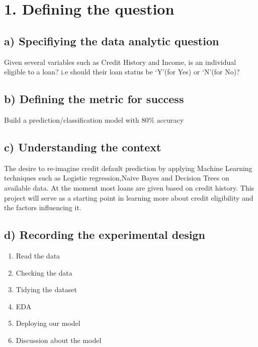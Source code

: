 \documentclass[
]{article}
\author{}
\date{\vspace{-2.5em}}
\providecommand{\tightlist}{%
  \setlength{\itemsep}{0pt}\setlength{\parskip}{0pt}}
\begin{document}
\hypertarget{defining-the-question}{%
\section{1. Defining the question}\label{defining-the-question}}

\hypertarget{a-specifiying-the-data-analytic-question}{%
\subsection{a) Specifiying the data analytic
question}\label{a-specifiying-the-data-analytic-question}}

Given several variables such as Credit History and Income, is an
individual eligible to a loan? i.e should their loan status be `Y'(for
Yes) or `N'(for No)?

\hypertarget{b-defining-the-metric-for-success}{%
\subsection{b) Defining the metric for
success}\label{b-defining-the-metric-for-success}}

Build a prediction/classification model with 80\% accuracy

\hypertarget{c-understanding-the-context}{%
\subsection{c) Understanding the
context}\label{c-understanding-the-context}}

The desire to re-imagine credit default prediction by applying Machine
Learning techniques such as Logistic regression,Naive Bayes and Decision
Trees on available data. At the moment most loans are given based on
credit history. This project will serve as a starting point in learning
more about credit eligibility and the factors influencing it.

\hypertarget{d-recording-the-experimental-design}{%
\subsection{d) Recording the experimental
design}\label{d-recording-the-experimental-design}}

\begin{enumerate}
\def\labelenumi{\Roman{enumi})}
\tightlist
\item
  Read the data
\item
  Checking the data
\item
  Tidying the dataset
\item
  EDA
\item
  Deploying our model
\item
  Discussion about the model
\end{enumerate}
\end{document}
